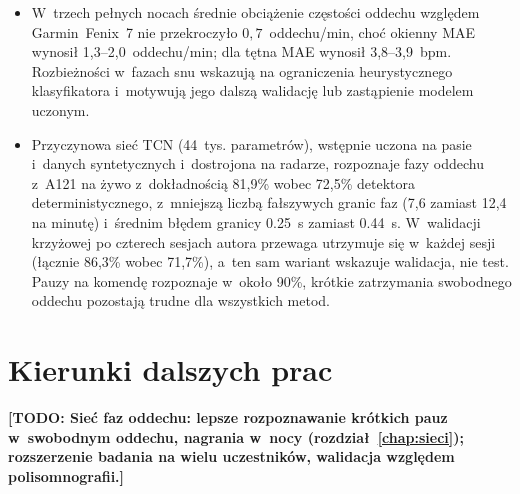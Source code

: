\documentclass[12pt,a4paper,oneside]{report}
\newcommand{\todo}[1]{\textcolor{red!75!black}{\textbf{[TODO: #1]}}}
\newcommand{\miejsce}[1]{\todo{#1}}
\begin{document}
\begin{itemize}
  prostopadłą zwiększyła natomiast echo o~około \SI{11}{dB}; właściwe
  wycelowanie radaru miało więc znacznie większe znaczenie niż metalowa łata.
  \item W~trzech pełnych nocach średnie obciążenie częstości oddechu względem
  Garmin~Fenix~7 nie przekroczyło $0{,}7$~oddechu/min, choć okienny MAE
  wynosił 1,3--2,0~oddechu/min; dla tętna MAE wynosił 3,8--3,9~bpm.
  Rozbieżności w~fazach snu wskazują na ograniczenia heurystycznego
  klasyfikatora i~motywują jego dalszą walidację lub zastąpienie modelem
  uczonym.
  \item Przyczynowa sieć TCN (44~tys. parametrów), wstępnie uczona na pasie i~danych
  syntetycznych i~dostrojona na radarze, rozpoznaje fazy oddechu z~A121 na żywo
  z~dokładnością 81,9\% wobec 72,5\% detektora deterministycznego, z~mniejszą
  liczbą fałszywych granic faz (7,6 zamiast 12,4 na minutę) i~średnim błędem granicy \SI{0.25}{s} zamiast \SI{0.44}{s}.
  W~walidacji krzyżowej po czterech sesjach autora przewaga utrzymuje się w~każdej sesji
  (łącznie 86,3\% wobec 71,7\%), a~ten sam wariant wskazuje walidacja, nie test.
  Pauzy na komendę rozpoznaje w~około 90\%, krótkie zatrzymania swobodnego oddechu
  pozostają trudne dla wszystkich metod.
\end{itemize}

\section{Kierunki dalszych prac}
\miejsce{Sieć faz oddechu: lepsze rozpoznawanie krótkich pauz w~swobodnym oddechu,
nagrania w~nocy (rozdział~\ref{chap:sieci}); rozszerzenie badania na wielu uczestników,
walidacja względem polisomnografii.}
\end{document}
